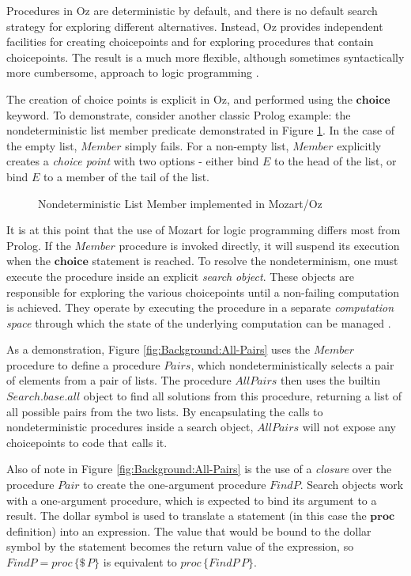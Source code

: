 Procedures in Oz are deterministic by default, and there is no default
search strategy for exploring different alternatives. Instead, Oz
provides independent facilities for creating choicepoints and for
exploring procedures that contain choicepoints. The result is a much
more flexible, although sometimes syntactically more cumbersome, approach
to logic programming \citep{lpinoz99}.

The creation of choice points is explicit in Oz, and performed using
the $\mathbf{choice}$ keyword. To demonstrate, consider another classic
Prolog example: the nondeterministic list member predicate demonstrated
in Figure \ref{fig:Background:Nondet-Member}. In the case of the
empty list, $Member$ simply fails. For a non-empty list, $Member$
explicitly creates a \emph{choice point} with two options - either
bind $E$ to the head of the list, or bind $E$ to a member of the
tail of the list.

%
\begin{figure}[t]

\caption{Nondeterministic List Member implemented in Mozart/Oz\label{fig:Background:Nondet-Member}}

\end{figure}


It is at this point that the use of Mozart for logic programming differs
most from Prolog. If the $Member$ procedure is invoked directly,
it will suspend its execution when the $\mathbf{choice}$ statement
is reached. To resolve the nondeterminism, one must execute the procedure
inside an explicit \emph{search} \emph{object}. These objects are
responsible for exploring the various choicepoints until a non-failing
computation is achieved. They operate by executing the procedure in
a separate \emph{computation space} through which the state of the
underlying computation can be managed \citep{schulte00constraint_services}.

As a demonstration, Figure \ref{fig:Background:All-Pairs} uses the
$Member$ procedure to define a procedure $Pairs$, which nondeterministically
selects a pair of elements from a pair of lists. The procedure $AllPairs$
then uses the builtin $Search.base.all$ object to find all solutions
from this procedure, returning a list of all possible pairs from the
two lists. By encapsulating the calls to nondeterministic procedures
inside a search object, $AllPairs$ will not expose any choicepoints
to code that calls it.

Also of note in Figure \ref{fig:Background:All-Pairs} is the use
of a \emph{closure} over the procedure $Pair$ to create the one-argument
procedure $FindP$. Search objects work with a one-argument procedure,
which is expected to bind its argument to a result. The dollar symbol
is used to translate a statement (in this case the $\mathbf{proc}$
definition) into an expression. The value that would be bound to the
dollar symbol by the statement becomes the return value of the expression,
so $FindP=proc\,\{\$\, P\}$ is equivalent to $proc\,\{FindP\, P\}$.

